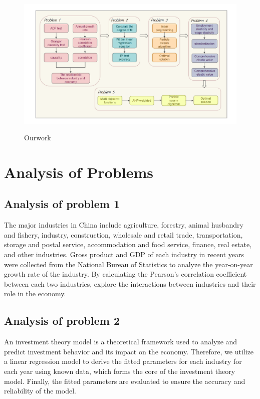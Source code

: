 \documentclass[12pt]{article}  %
\begin{document}
\begin{figure}[H]  %
\centering  %
\label{ourwork}
\includegraphics[width=.9\textwidth]{img/our_work.png} %
\caption{Ourwork} %
\end{figure}
\vspace{-0.8cm}

\section{Analysis of Problems} %
\subsection{Analysis of problem 1} %
	The major industries in China include agriculture, forestry, animal husbandry and fishery, industry, construction, wholesale and retail trade, transportation, storage and postal service, accommodation and food service, finance, real estate, and other industries. Gross product and GDP of each industry in recent years were collected from the National Bureau of Statistics to analyze the year-on-year growth rate of the industry. By calculating the Pearson's correlation coefficient between each two industries, explore the interactions between industries and their role in the economy.
	
\subsection{Analysis of problem 2} %
	An investment theory model is a theoretical framework used to analyze and predict investment behavior and its impact on the economy. Therefore, we utilize a linear regression model to derive the fitted parameters for each industry for each year using known data, which forms the core of the investment theory model. Finally, the fitted parameters are evaluated to ensure the accuracy and reliability of the model.
\end{document}
